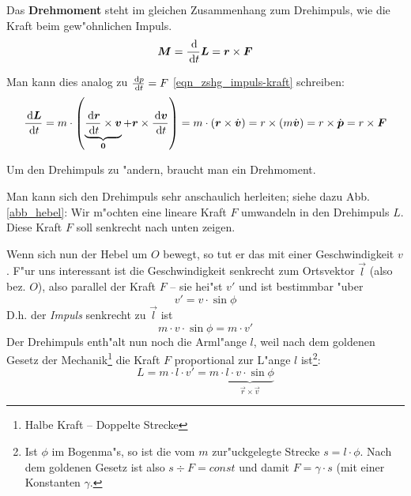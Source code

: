 \begin{Def}
   \label{def_drehmoment}
   Das \textbf{Drehmoment} steht im gleichen Zusammenhang zum Drehimpuls, wie
   die Kraft beim gew"ohnlichen Impuls.
   \begin{equation}
      \label{eqn_def_drehmoment}
      \Vec M = \frac{\diff}{\diff t} \Vec L = \Vec r \times \Vec F
   \end{equation}
\end{Def}
Man kann dies analog zu $\frac{\, \mathrm{d} p}{\, \mathrm{d} t} = F$
\eqref{eqn_zshg_impuls-kraft} schreiben:
\begin{equation*}
   \label{eqn_differenz-c8}
   \frac{\, \mathrm{d} \boldsymbol{L}}{\, \mathrm{d} t } = 
m \cdot \left ( \underbrace{\frac{\, \mathrm{d} \boldsymbol{r}}{\, \mathrm{d} t} \times \boldsymbol{v}}_{\boldsymbol{0}} + 
\boldsymbol{r} \times \frac{\, \mathrm{d} \boldsymbol{v}}{\, \mathrm{d} t} \right ) =
m \cdot ( \boldsymbol{r} \times \dot{ \boldsymbol{v}} ) = r \times (m\dot{\boldsymbol{v}}) = r
\times \dot{\boldsymbol{p}} = r \times \boldsymbol{F}
\end{equation*}
\begin{Wichtig}
   Um den Drehimpuls zu "andern, braucht man ein Drehmoment.
\end{Wichtig}



Man kann sich den Drehimpuls sehr anschaulich herleiten; siehe dazu
Abb. \ref{abb_hebel}: Wir m"ochten eine lineare Kraft $F$ umwandeln in
den Drehimpuls $L$. Diese Kraft $F$ soll senkrecht nach unten zeigen.

Wenn sich nun der Hebel um $O$ bewegt, so tut er das mit einer
Geschwindigkeit $v$. F"ur uns interessant ist die Geschwindigkeit
senkrecht zum Ortsvektor $\vec l$ (also bez. $O$), also
parallel der Kraft $F$ -- sie hei"st $v'$ und ist bestimmbar "uber
$$
  v' = v \cdot \sin \phi
$$
D.h. der \emph{Impuls} senkrecht zu $ \vec l$ ist
$$
m \cdot v \cdot \sin \phi = m \cdot v'
$$ 
Der Drehimpuls enth"alt nun noch die Arml"ange $l$, weil nach dem
goldenen Gesetz der Mechanik\footnote{Halbe Kraft -- Doppelte Strecke}
die Kraft $F$ proportional zur L"ange $l$ ist\footnote{Ist $\phi$ im
  Bogenma"s, so ist die vom $m$ zur"uckgelegte Strecke $s = l \cdot
  \phi$. Nach dem goldenen Gesetz ist also $s \div F = const$ und
  damit $F = \gamma \cdot s$ (mit einer Konstanten $\gamma$.}:
$$
L = m \cdot l \cdot v' = m \cdot \underbrace{l \cdot v \cdot \sin
  \phi}_{\Vec r \times \Vec v}
$$



